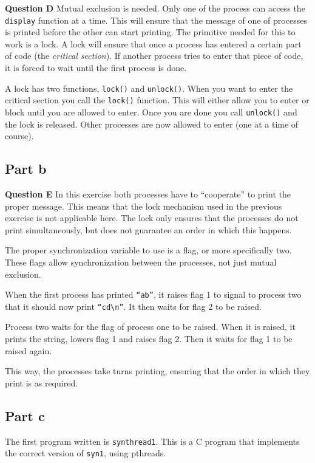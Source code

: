 \documentclass[a4paper]{article}
\begin{document}
\textbf{Question D} Mutual exclusion is needed. Only one of the process can access the
\texttt{display} function at a time. This will ensure that the message of one of processes
is printed before the other can start printing. The primitive needed for this to work is a
lock. A lock will ensure that once a process has entered a certain part of code (the
\emph{critical section}). If another process tries to enter that piece of code, it is 
forced to wait until the first process is done.

A lock has two functions, \texttt{lock()} and \texttt{unlock()}. When you want to enter 
the critical section you call the \texttt{lock()} function. This will either allow you to
enter or block until you are allowed to enter. Once you are done you call
\texttt{unlock()} and the lock is released. Other processes are now allowed to enter (one
at a time of course).

\subsection{Part b}
\textbf{Question E} In this exercise both processes have to ``cooperate'' to print the
proper message. This means that the lock mechanism used in the previous exercise is not
applicable here. The lock only ensures that the processes do not print simultaneously, but
does not guarantee an order in which this happens.

The proper synchronization variable to use is a flag, or more specifically two. These 
flags allow synchronization between the processes, not just mutual exclusion.

When the first process has printed \texttt{``ab''}, it raises flag 1 to signal to process
two that it should now print \texttt{``cd\textbackslash n''}. It then waits for flag 2 to
be raised.

Process two waits for the flag of process one to be raised. When it is raised, it prints
the string, lowers flag 1 and raises flag 2. Then it waits for flag 1 to be raised again.

This way, the processes take turns printing, ensuring that the order in which they print
is as required.

\subsection{Part c}

The first program written is \texttt{synthread1}. This is a C program that implements the
correct version of \texttt{syn1}, using pthreads.
\end{document}
